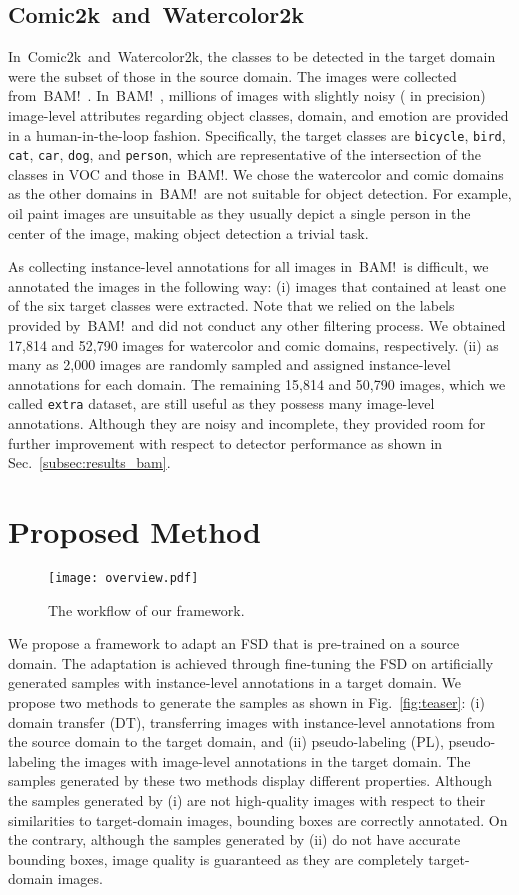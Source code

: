 \documentclass[10pt,twocolumn,letterpaper]{article}
\newcommand{\Fref}[1]{Fig.~\ref{#1}}
\newcommand{\Sref}[1]{Sec.~\ref{#1}}
\newcommand{\datasetwatercolor}{Watercolor2k}
\newcommand{\datasetcomic}{Comic2k}
\newcommand{\bam}{BAM!}
\begin{document}
\subsection{\datasetcomic~and~\datasetwatercolor}
\label{subsec:dataset_comic_and_watercolor}
In~\datasetcomic~and~\datasetwatercolor, the classes to be detected in the target domain were the subset of those in the source domain.
The images were collected from~\bam~\cite{wilber2017bam}.
In~\bam~, millions of images with slightly noisy ( in precision) image-level attributes regarding object classes, domain, and emotion are provided in a human-in-the-loop fashion.
Specifically, the target classes are \texttt{bicycle}, \texttt{bird}, \texttt{cat}, \texttt{car}, \texttt{dog}, and \texttt{person}, which are representative of the intersection of the classes in VOC and those in~\bam.
We chose the watercolor and comic domains as the other domains in~\bam~are not suitable for object detection.
For example, oil paint images are unsuitable as they usually depict a single person in the center of the image, making object detection a trivial task.

As collecting instance-level annotations for all images in~\bam~is difficult, we annotated the images in the following way: 
(i) images that contained at least one of the six target classes were extracted.
Note that we relied on the labels provided by~\bam~and did not conduct any other filtering process.
We obtained 17,814 and 52,790 images for watercolor and comic domains, respectively. 
(ii) as many as 2,000 images are randomly sampled and assigned instance-level annotations for each domain.
The remaining 15,814 and 50,790 images, which we called \texttt{extra} dataset, are still useful as they possess many image-level annotations.
Although they are noisy and incomplete, they provided room for further improvement with respect to detector performance as shown in \Sref{subsec:results_bam}.


\section{Proposed Method}
\begin{figure}[t]
    \centering
    \texttt{[image: overview.pdf]}
    \caption{The workflow of our framework.}
    \label{fig:overview}
\end{figure}
We propose a framework to adapt an FSD that is pre-trained on a source domain.
The adaptation is achieved through fine-tuning the FSD on artificially generated samples with instance-level annotations in a target domain.
We propose two methods to generate the samples as shown in \Fref{fig:teaser}:
(i) domain transfer (DT), transferring images with instance-level annotations from the source domain to the target domain, and (ii) pseudo-labeling (PL), pseudo-labeling the images with image-level annotations in the target domain.
The samples generated by these two methods display different properties.
Although the samples generated by (i) are not high-quality images with respect to their similarities to target-domain images, bounding boxes are correctly annotated.
On the contrary, although the samples generated by (ii) do not have accurate bounding boxes, image quality is guaranteed as they are completely target-domain images.
\end{document}
